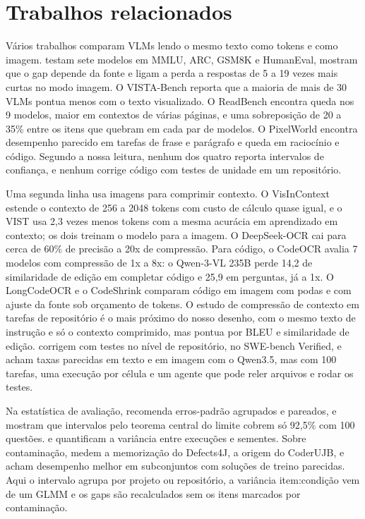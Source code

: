 \section{Trabalhos relacionados}
Vários trabalhos comparam VLMs lendo o mesmo texto como tokens e como imagem. \citet{sun2026reading} testam sete modelos em MMLU, ARC, GSM8K e HumanEval, mostram que o gap depende da fonte e ligam a perda a respostas de 5 a 19 vezes mais curtas no modo imagem. O VISTA-Bench \citep{liu2026vista} reporta que a maioria de mais de 30 VLMs pontua menos com o texto visualizado. O ReadBench \citep{clavie2025readbench} encontra queda nos 9 modelos, maior em contextos de várias páginas, e uma sobreposição de 20 a 35\% entre os itens que quebram em cada par de modelos. O PixelWorld \citep{lyu2025pixelworld} encontra desempenho parecido em tarefas de frase e parágrafo e queda em raciocínio e código. Segundo a nossa leitura, nenhum dos quatro reporta intervalos de confiança, e nenhum corrige código com testes de unidade em um repositório.

Uma segunda linha usa imagens para comprimir contexto. O VisInContext \citep{wang2024visincontext} estende o contexto de 256 a 2048 tokens com custo de cálculo quase igual, e o VIST \citep{xing2025vist} usa 2,3 vezes menos tokens com a mesma acurácia em aprendizado em contexto; os dois treinam o modelo para a imagem. O DeepSeek-OCR \citep{wei2025deepseekocr} cai para cerca de 60\% de precisão a 20x de compressão. Para código, o CodeOCR \citep{shi2026codeocr} avalia 7 modelos com compressão de 1x a 8x: o Qwen-3-VL 235B perde 14,2 de similaridade de edição em completar código e 25,9 em perguntas, já a 1x. O LongCodeOCR \citep{zhong2026longcodeocr} e o CodeShrink \citep{tang2026codeshrink} comparam código em imagem com podas e com ajuste da fonte sob orçamento de tokens. O estudo de compressão de contexto em tarefas de repositório \citep{feng2026compression} é o mais próximo do nosso desenho, com o mesmo texto de instrução e só o contexto comprimido, mas pontua por BLEU e similaridade de edição. \citet{liang2026rendered} corrigem com testes no nível de repositório, no SWE-bench Verified, e acham taxas parecidas em texto e em imagem com o Qwen3.5, mas com 100 tarefas, uma execução por célula e um agente que pode reler arquivos e rodar os testes.

Na estatística de avaliação, \citet{miller2024errorbars} recomenda erros-padrão agrupados e pareados, e \citet{bowyer2025clt} mostram que intervalos pelo teorema central do limite cobrem só 92,5\% com 100 questões. \citet{madaan2024variance} e \citet{bouthillier2021variance} quantificam a variância entre execuções e sementes. Sobre contaminação, \citet{ramos2024memorizing} medem a memorização do Defects4J, a origem do CoderUJB, e \citet{riddell2024contamination} acham desempenho melhor em subconjuntos com soluções de treino parecidas. Aqui o intervalo agrupa por projeto ou repositório, a variância item:condição vem de um GLMM e os gaps são recalculados sem os itens marcados por contaminação.
